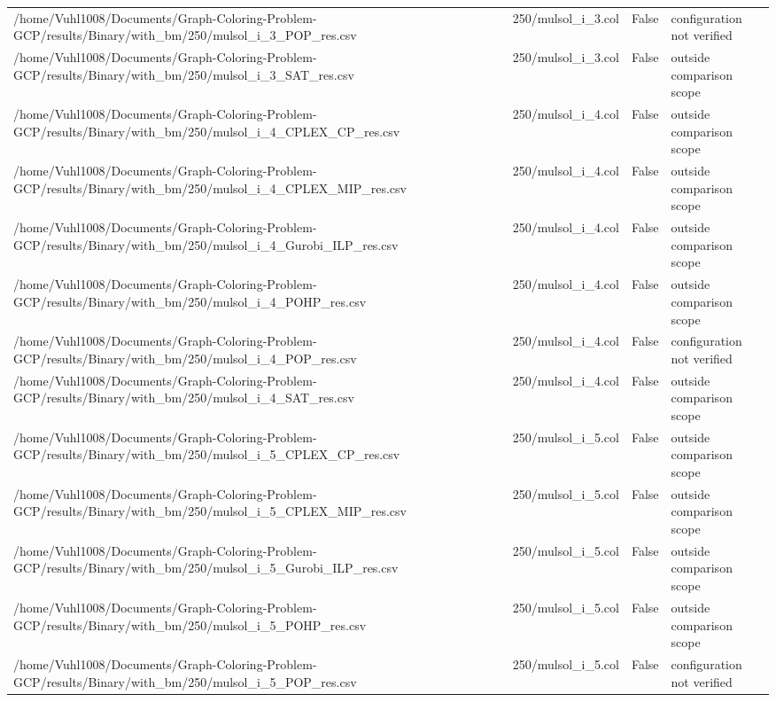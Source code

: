 \begin{table}[htbp]
\begin{tabular}{llll}
/home/Vuhl1008/Documents/Graph-Coloring-Problem-GCP/results/Binary/with\_bm/250/mulsol\_i\_3\_POP\_res.csv & 250/mulsol\_i\_3.col & False & configuration not verified \\
/home/Vuhl1008/Documents/Graph-Coloring-Problem-GCP/results/Binary/with\_bm/250/mulsol\_i\_3\_SAT\_res.csv & 250/mulsol\_i\_3.col & False & outside comparison scope \\
/home/Vuhl1008/Documents/Graph-Coloring-Problem-GCP/results/Binary/with\_bm/250/mulsol\_i\_4\_CPLEX\_CP\_res.csv & 250/mulsol\_i\_4.col & False & outside comparison scope \\
/home/Vuhl1008/Documents/Graph-Coloring-Problem-GCP/results/Binary/with\_bm/250/mulsol\_i\_4\_CPLEX\_MIP\_res.csv & 250/mulsol\_i\_4.col & False & outside comparison scope \\
/home/Vuhl1008/Documents/Graph-Coloring-Problem-GCP/results/Binary/with\_bm/250/mulsol\_i\_4\_Gurobi\_ILP\_res.csv & 250/mulsol\_i\_4.col & False & outside comparison scope \\
/home/Vuhl1008/Documents/Graph-Coloring-Problem-GCP/results/Binary/with\_bm/250/mulsol\_i\_4\_POHP\_res.csv & 250/mulsol\_i\_4.col & False & outside comparison scope \\
/home/Vuhl1008/Documents/Graph-Coloring-Problem-GCP/results/Binary/with\_bm/250/mulsol\_i\_4\_POP\_res.csv & 250/mulsol\_i\_4.col & False & configuration not verified \\
/home/Vuhl1008/Documents/Graph-Coloring-Problem-GCP/results/Binary/with\_bm/250/mulsol\_i\_4\_SAT\_res.csv & 250/mulsol\_i\_4.col & False & outside comparison scope \\
/home/Vuhl1008/Documents/Graph-Coloring-Problem-GCP/results/Binary/with\_bm/250/mulsol\_i\_5\_CPLEX\_CP\_res.csv & 250/mulsol\_i\_5.col & False & outside comparison scope \\
/home/Vuhl1008/Documents/Graph-Coloring-Problem-GCP/results/Binary/with\_bm/250/mulsol\_i\_5\_CPLEX\_MIP\_res.csv & 250/mulsol\_i\_5.col & False & outside comparison scope \\
/home/Vuhl1008/Documents/Graph-Coloring-Problem-GCP/results/Binary/with\_bm/250/mulsol\_i\_5\_Gurobi\_ILP\_res.csv & 250/mulsol\_i\_5.col & False & outside comparison scope \\
/home/Vuhl1008/Documents/Graph-Coloring-Problem-GCP/results/Binary/with\_bm/250/mulsol\_i\_5\_POHP\_res.csv & 250/mulsol\_i\_5.col & False & outside comparison scope \\
/home/Vuhl1008/Documents/Graph-Coloring-Problem-GCP/results/Binary/with\_bm/250/mulsol\_i\_5\_POP\_res.csv & 250/mulsol\_i\_5.col & False & configuration not verified \\

\end{tabular}
\end{table}
